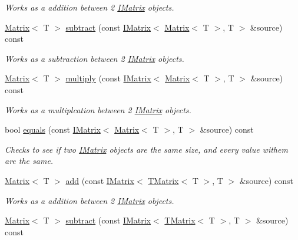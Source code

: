 \begin{DoxyCompactItemize}
\begin{DoxyCompactList}\small\item\em Works as a addition between 2 \mbox{\hyperlink{class_i_matrix}{I\+Matrix}} objects. \end{DoxyCompactList}\item 
\mbox{\hyperlink{class_matrix}{Matrix}}$<$ T $>$ \mbox{\hyperlink{class_d_matrix_ad7521c1d7b1b3b1faf30be6612a829f0}{subtract}} (const \mbox{\hyperlink{class_i_matrix}{I\+Matrix}}$<$ \mbox{\hyperlink{class_matrix}{Matrix}}$<$ T $>$, T $>$ \&source) const
\begin{DoxyCompactList}\small\item\em Works as a subtraction between 2 \mbox{\hyperlink{class_i_matrix}{I\+Matrix}} objects. \end{DoxyCompactList}\item 
\mbox{\hyperlink{class_matrix}{Matrix}}$<$ T $>$ \mbox{\hyperlink{class_d_matrix_a399e3f1c303958f8eadb17e713da186d}{multiply}} (const \mbox{\hyperlink{class_i_matrix}{I\+Matrix}}$<$ \mbox{\hyperlink{class_matrix}{Matrix}}$<$ T $>$, T $>$ \&source) const
\begin{DoxyCompactList}\small\item\em Works as a multiplcation between 2 \mbox{\hyperlink{class_i_matrix}{I\+Matrix}} objects. \end{DoxyCompactList}\item 
bool \mbox{\hyperlink{class_d_matrix_a7756fa7a5bff4efa1c65a1e0b66a9af7}{equals}} (const \mbox{\hyperlink{class_i_matrix}{I\+Matrix}}$<$ \mbox{\hyperlink{class_matrix}{Matrix}}$<$ T $>$, T $>$ \&source) const
\begin{DoxyCompactList}\small\item\em Checks to see if two \mbox{\hyperlink{class_i_matrix}{I\+Matrix}} objects are the same size, and every value withem are the same. \end{DoxyCompactList}\item 
\mbox{\hyperlink{class_matrix}{Matrix}}$<$ T $>$ \mbox{\hyperlink{class_d_matrix_ab4b552272ab2e8602b99bccd68702626}{add}} (const \mbox{\hyperlink{class_i_matrix}{I\+Matrix}}$<$ \mbox{\hyperlink{class_t_matrix}{T\+Matrix}}$<$ T $>$, T $>$ \&source) const
\begin{DoxyCompactList}\small\item\em Works as a addition between 2 \mbox{\hyperlink{class_i_matrix}{I\+Matrix}} objects. \end{DoxyCompactList}\item 
\mbox{\hyperlink{class_matrix}{Matrix}}$<$ T $>$ \mbox{\hyperlink{class_d_matrix_a7d90783b21941d4abd0898867b337c5f}{subtract}} (const \mbox{\hyperlink{class_i_matrix}{I\+Matrix}}$<$ \mbox{\hyperlink{class_t_matrix}{T\+Matrix}}$<$ T $>$, T $>$ \&source) const

\end{DoxyCompactItemize}

